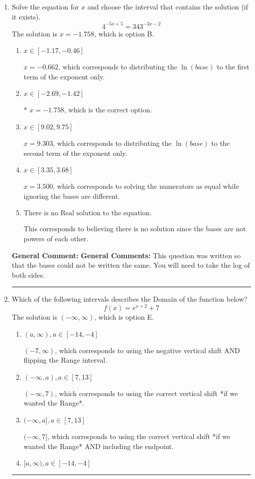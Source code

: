 \documentclass{extbook}[14pt]
\newcommand{\litem}[1]{\item #1

\rule{\textwidth}{0.4pt}}
\begin{document}
\begin{enumerate}\litem{
Solve the equation for $x$ and choose the interval that contains the solution (if it exists).
\[ 4^{-5x+5} = 343^{-3x-2} \]The solution is \( x = -1.758 \), which is option B.\begin{enumerate}[label=\Alph*.]
\item \( x \in [-1.17, -0.46] \)

$x = -0.662$, which corresponds to distributing the $\ln(base)$ to the first term of the exponent only.
\item \( x \in [-2.69, -1.42] \)

* $x = -1.758$, which is the correct option.
\item \( x \in [9.02, 9.75] \)

$x = 9.303$, which corresponds to distributing the $\ln(base)$ to the second term of the exponent only.
\item \( x \in [3.35, 3.68] \)

$x = 3.500$, which corresponds to solving the numerators as equal while ignoring the bases are different.
\item \( \text{There is no Real solution to the equation.} \)

This corresponds to believing there is no solution since the bases are not powers of each other.
\end{enumerate}

\textbf{General Comment:} \textbf{General Comments:} This question was written so that the bases could not be written the same. You will need to take the log of both sides.
}
\litem{
Which of the following intervals describes the Domain of the function below?
\[ f(x) = e^{x+2}+7 \]The solution is \( (-\infty, \infty) \), which is option E.\begin{enumerate}[label=\Alph*.]
\item \( (a, \infty), a \in [-14, -4] \)

$(-7, \infty)$, which corresponds to using the negative vertical shift AND flipping the Range interval.
\item \( (-\infty, a), a \in [7, 13] \)

$(-\infty, 7)$, which corresponds to using the correct vertical shift *if we wanted the Range*.
\item \( (-\infty, a], a \in [7, 13] \)

$(-\infty, 7]$, which corresponds to using the correct vertical shift *if we wanted the Range* AND including the endpoint.
\item \( [a, \infty), a \in [-14, -4] \)


\end{enumerate}}
\end{enumerate}
\end{document}
